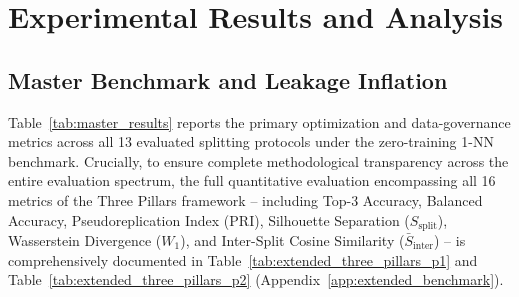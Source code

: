 \documentclass[a4paper,fleqn]{cas-sc}
\begin{document}
\section{Experimental Results and Analysis}
\label{sec:results}

\subsection{Master Benchmark and Leakage Inflation}
Table~\ref{tab:master_results} reports the primary optimization and data-governance metrics across all 13 evaluated splitting protocols under the zero-training 1-NN benchmark. Crucially, to ensure complete methodological transparency across the entire evaluation spectrum, the full quantitative evaluation encompassing all 16 metrics of the Three Pillars framework -- including Top-3 Accuracy, Balanced Accuracy, Pseudoreplication Index ($\mathrm{PRI}$), Silhouette Separation ($S_{\text{split}}$), Wasserstein Divergence ($W_1$), and Inter-Split Cosine Similarity ($\bar{S}_{\text{inter}}$) -- is comprehensively documented in Table~\ref{tab:extended_three_pillars_p1} and Table~\ref{tab:extended_three_pillars_p2} (Appendix~\ref{app:extended_benchmark}).
\end{document}
